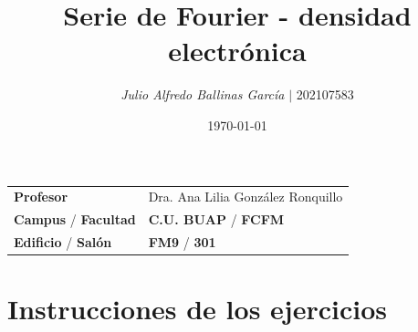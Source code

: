 \documentclass{article}
\title{Serie de Fourier - densidad electrónica}
\author{\emph{Julio Alfredo Ballinas García} $\boldsymbol{\mid}$ 202107583}
\date{\today}
\begin{document}
\maketitle



\begin{mybox}
\noindent\begin{tabular}{@{}ll}
	{\bfseries{Profesor}} & Dra. Ana Lilia González Ronquillo\\
	\textcolor{prussianblue}{\bfseries{Campus}} / \textcolor{trueblue}{\bfseries{Facultad}}  & \textcolor{prussianblue}{\bfseries{C.U. BUAP}} /  \textcolor{trueblue}{\bfseries{FCFM}} \\
	\textcolor{prussianblue}{\bfseries{Edificio}} /  \textcolor{trueblue}{\bfseries{Salón}}    & 	\textcolor{prussianblue}{\bfseries{FM9}} /  \textcolor{trueblue}{\bfseries{301}}   
\end{tabular} 
\end{mybox} \vspace{1cm}

\section{Instrucciones de los ejercicios}
\end{document}
